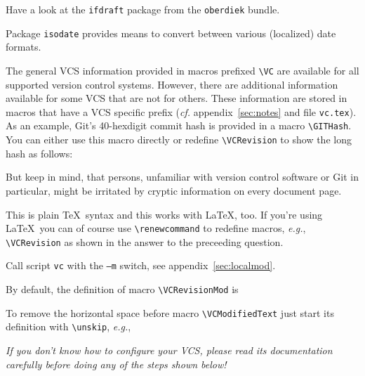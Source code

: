 \documentclass[11pt]{article}
\begin{document}
 Have a look at the \texttt{ifdraft} package from
the \texttt{oberdiek} bundle.

 Package \texttt{isodate} provides means to convert
between various (localized) date formats.

 The general VCS information provided in macros
prefixed \verb+\VC+ are available for all supported version control
systems.  However, there are additional information available for some
VCS that are not for others.  These information are stored in macros
that have a VCS specific prefix (\emph{cf.} appendix~\ref{sec:notes} and
file \texttt{vc.tex}).  As an example, Git's 40-hexdigit commit hash is
provided in a macro \verb+\GITHash+.  You can either use this macro
directly or redefine \verb+\VCRevision+ to show the long hash as
follows:
\begin{listing}[style=TeX]
\renewcommand*{\VCRevision}{\GITHash}
\end{listing}
But keep in mind, that persons, unfamiliar with version control software
or Git in particular, might be irritated by cryptic information on every
document page.

 This is plain \TeX\ syntax and this works with
\LaTeX, too.  If you're using \LaTeX\ you can of course use
\verb+\renewcommand+ to redefine macros, \emph{e.g.}, \verb+\VCRevision+
as shown in the answer to the preceeding question.

 Call script \texttt{vc} with the \texttt{--m}
switch, see appendix~\ref{sec:localmod}.

 By default, the definition of macro
\verb+\VCRevisionMod+ is
\begin{listing}[style=TeX]
\gdef\VCRevisionMod{\VCRevision~\VCModifiedText}
\end{listing}
To remove the horizontal space before macro \verb+\VCModifiedText+ just
start its definition with \verb+\unskip+, \emph{e.g.},
\begin{listing}[style=TeX]
\gdef\VCModifiedText{\unskip, modified}
\end{listing}

 \emph{If you don't know how to configure your
  VCS, please read its documentation carefully before doing any of the
  steps shown below!}
\end{document}
